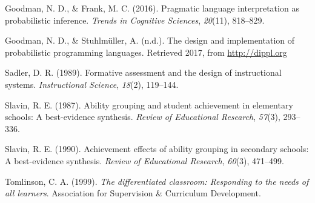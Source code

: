 \documentclass[10pt, letterpaper]{article}
\begin{document}
\hypertarget{ref-goodman2016}{}
Goodman, N. D., \& Frank, M. C. (2016). Pragmatic language
interpretation as probabilistic inference. \emph{Trends in Cognitive
Sciences}, \emph{20}(11), 818--829.

\hypertarget{ref-goodman2017}{}
Goodman, N. D., \& Stuhlmüller, A. (n.d.). The design and implementation
of probabilistic programming languages. Retrieved 2017, from
\url{http://dippl.org}

\hypertarget{ref-sadler1989}{}
Sadler, D. R. (1989). Formative assessment and the design of
instructional systems. \emph{Instructional Science}, \emph{18}(2),
119--144.

\hypertarget{ref-slavin1987}{}
Slavin, R. E. (1987). Ability grouping and student achievement in
elementary schools: A best-evidence synthesis. \emph{Review of
Educational Research}, \emph{57}(3), 293--336.

\hypertarget{ref-slavin1990}{}
Slavin, R. E. (1990). Achievement effects of ability grouping in
secondary schools: A best-evidence synthesis. \emph{Review of
Educational Research}, \emph{60}(3), 471--499.

\hypertarget{ref-tomlinson1999}{}
Tomlinson, C. A. (1999). \emph{The differentiated classroom: Responding
to the needs of all learners}. Association for Supervision \& Curriculum
Development.
\end{document}
